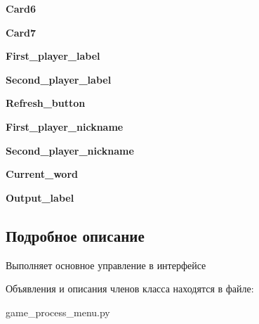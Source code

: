 \begin{DoxyCompactItemize}
\mbox{\label{classgame__process__menu_1_1_ui___main_window_a63579e3810024515d2062d3bb53a6b96}} 
{\bfseries Card6}
\item 
\mbox{\label{classgame__process__menu_1_1_ui___main_window_a48cca9daf6b410f491673ad7159929b5}} 
{\bfseries Card7}
\item 
\mbox{\label{classgame__process__menu_1_1_ui___main_window_a2537ea406e32bcc8557acf04c8900c5d}} 
{\bfseries First\+\_\+player\+\_\+label}
\item 
\mbox{\label{classgame__process__menu_1_1_ui___main_window_a0373f61bb40a4dc408971e37e2c47fa1}} 
{\bfseries Second\+\_\+player\+\_\+label}
\item 
\mbox{\label{classgame__process__menu_1_1_ui___main_window_a635cfe75923bc518a4a95d1903dc0652}} 
{\bfseries Refresh\+\_\+button}
\item 
\mbox{\label{classgame__process__menu_1_1_ui___main_window_abd78a9b7767e3088ed23a513c12c81e7}} 
{\bfseries First\+\_\+player\+\_\+nickname}
\item 
\mbox{\label{classgame__process__menu_1_1_ui___main_window_a8fe1437ccc7615aeda98533be6f14bb6}} 
{\bfseries Second\+\_\+player\+\_\+nickname}
\item 
\mbox{\label{classgame__process__menu_1_1_ui___main_window_a51d0ef04ebaca1d1125dc9f3ea7c66aa}} 
{\bfseries Current\+\_\+word}
\item 
\mbox{\label{classgame__process__menu_1_1_ui___main_window_a8e4ea1055cc461b3e252c0c75b187479}} 
{\bfseries Output\+\_\+label}
\end{DoxyCompactItemize}


\subsection{Подробное описание}
Выполняет основное управление в интерфейсе 



Объявления и описания членов класса находятся в файле\+:\begin{DoxyCompactItemize}
\item 
game\+\_\+process\+\_\+menu.\+py\end{DoxyCompactItemize}
